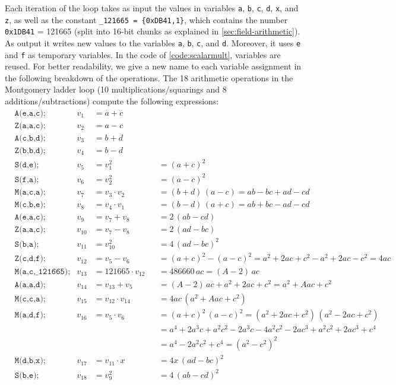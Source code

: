 \documentclass{article}
\begin{document}
Each iteration of the loop takes as input the values in variables \verb|a|, \verb|b|, \verb|c|, \verb|d|, \verb|x|, and \verb|z|, as well as the constant \verb|_121665 = {0xDB41,1}|, which contains the number \verb|0x1DB41| = 121665 (split into 16-bit chunks as explained in \autoref{sec:field-arithmetic}).
As output it writes new values to the variables \verb|a|, \verb|b|, \verb|c|, and \verb|d|.
Moreover, it uses \verb|e| and \verb|f| as temporary variables.
In the code of \autoref{code:scalarmult}, variables are reused.
For better readability, we give a new name to each variable assignment in the following breakdown of the operations.
The 18 arithmetic operations in the Montgomery ladder loop (10 multiplications/squarings and 8 additions/subtractions) compute the following expressions:
\begin{align*}
    & \texttt{A(e,a,c);} & v_1    &= a + c \\
    & \texttt{Z(a,a,c);} & v_2    &= a - c \\
    & \texttt{A(c,b,d);} & v_3    &= b + d \\
    & \texttt{Z(b,b,d);} & v_4    &= b - d \\
    & \texttt{S(d,e);}   & v_5    &= v_1^2          &&= (a + c)^2 \\
    & \texttt{S(f,a);}   & v_6    &= v_2^2          &&= (a - c)^2 \\
    & \texttt{M(a,c,a);} & v_7    &= v_3 \cdot v_2  &&= (b + d)\,(a - c) = ab - bc + ad - cd \\
    & \texttt{M(c,b,e);} & v_8    &= v_4 \cdot v_1  &&= (b - d)\,(a + c) = ab + bc - ad - cd \\
    & \texttt{A(e,a,c);} & v_9    &= v_7 + v_8      &&= 2\,(ab - cd) \\
    & \texttt{Z(a,a,c);} & v_{10} &= v_7 - v_8      &&= 2\,(ad - bc) \\
    & \texttt{S(b,a);}   & v_{11} &= v_{10}^2       &&= 4\,(ad - bc)^2 \\
    & \texttt{Z(c,d,f);} & v_{12} &= v_5 - v_6      &&= (a + c)^2 - (a - c)^2 = a^2 + 2ac + c^2 - a^2 + 2ac - c^2 = 4ac \\
    & \texttt{M(a,c,{\char`_}121665);} & v_{13} &= 121665 \cdot v_{12} &&= 486660\, ac = (A - 2)\,ac \\
    & \texttt{A(a,a,d);} & v_{14} &= v_{13} + v_5   &&= (A - 2)\,ac + a^2 + 2ac + c^2 = a^2 + Aac + c^2 \\
    & \texttt{M(c,c,a);} & v_{15} &= v_{12} \cdot v_{14} &&= 4ac\, (a^2 + Aac + c^2) \\
    & \texttt{M(a,d,f);} & v_{16} &= v_5 \cdot v_6  &&= (a + c)^2\,(a - c)^2 = (a^2 + 2ac + c^2)\,(a^2 - 2ac + c^2) \\
    &                    &        &                 &&= a^4 + 2a^3 c + a^2 c^2 - 2a^3 c - 4 a^2 c^2 - 2a c^3 + a^2 c^2 + 2a c^3 + c^4 \\
    &                    &        &                 &&= a^4 - 2a^2 c^2 + c^4 = (a^2 - c^2)^2 \\
    & \texttt{M(d,b,x);} & v_{17} &= v_{11} \cdot x &&= 4x\,(ad - bc)^2 \\
    & \texttt{S(b,e);}   & v_{18} &= v_9^2          &&= 4\,(ab - cd)^2
\end{align*}
\end{document}
